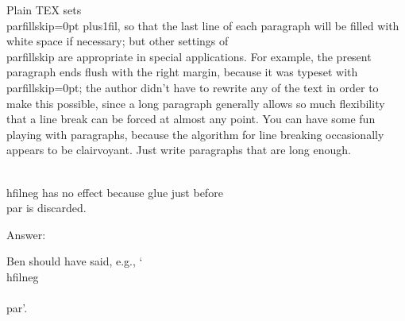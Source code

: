 Plain TEX sets \\parfillskip=0pt plus1fil,
so that the last line of each paragraph will
be filled with white space if necessary;
but other settings of \\parfillskip are appropriate in special applications.
For example, the present paragraph ends flush with the
right margin, because it was typeset with \\parfillskip=0pt; the author didn’t have to
rewrite any of the text in order to make this possible, since a long paragraph generally
allows so much flexibility that a line break can be forced at almost any point. You
can have some fun playing with paragraphs, because the algorithm for line breaking
occasionally appears to be clairvoyant. Just write paragraphs that are long enough.


\\hfilneg has no effect because glue just before \\par is discarded.

Answer:

Ben should
have said, e.g., ‘\\hfilneg\\{ }\\par’.

\bye



